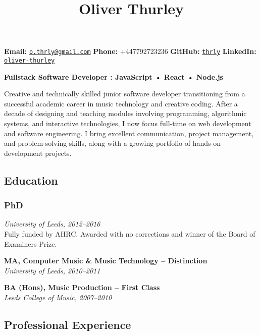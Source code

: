 \documentclass[11pt,a4paper]{article}
\title{\textcolor{devblue}{\large Oliver Thurley}}
\author{}
\date{}
\begin{document}
\maketitle

\vspace{-1em}
\noindent\textbf{Email:} \href{mailto:o.thrly@gmail.com}{\texttt{o.thrly@gmail.com}} \hspace{1em}
\textbf{Phone:} +447792723236 \hspace{1em}
\textbf{GitHub:} \href{https://github.com/thrly}{\texttt{thrly}} \hspace{1em}
\textbf{LinkedIn:} \href{https://linkedin.com/in/oliver-thurley}{\texttt{oliver-thurley}}

\vspace{1em}

\textbf{Fullstack Software Developer : JavaScript • React • Node.js}

Creative and technically skilled junior software developer transitioning
from a successful academic career in music technology and creative
coding. After a decade of designing and teaching modules involving
programming, algorithmic systems, and interactive technologies, I now
focus full-time on web development and software engineering. I bring
excellent communication, project management, and problem-solving skills,
along with a growing portfolio of hands-on development projects.

\subsection{Education}\label{education}

\subsubsection{PhD}\label{phd}

\emph{University of Leeds, 2012--2016}\\
Fully funded by AHRC. Awarded with no corrections and winner of the
Board of Examiners Prize.

\textbf{MA, Computer Music \& Music Technology -- Distinction}\\
\emph{University of Leeds, 2010--2011}

\textbf{BA (Hons), Music Production -- First Class}\\
\emph{Leeds College of Music, 2007--2010}

\subsection{Professional Experience}\label{professional-experience}
\end{document}
